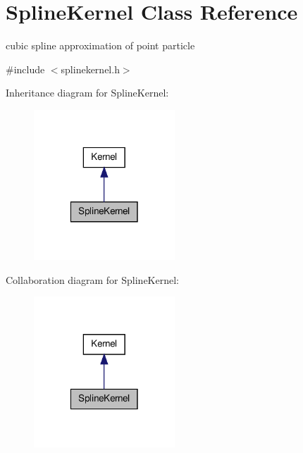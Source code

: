 \hypertarget{classSplineKernel}{\section{\-Spline\-Kernel \-Class \-Reference}
\label{classSplineKernel}
}


cubic spline approximation of point particle  




{\ttfamily \#include $<$splinekernel.\-h$>$}



\-Inheritance diagram for \-Spline\-Kernel\-:\nopagebreak
\begin{figure}[H]
\begin{center}
\leavevmode
\includegraphics[width=150pt]{classSplineKernel__inherit__graph}
\end{center}
\end{figure}


\-Collaboration diagram for \-Spline\-Kernel\-:\nopagebreak
\begin{figure}[H]
\begin{center}
\leavevmode
\includegraphics[width=150pt]{classSplineKernel__coll__graph}
\end{center}
\end{figure}
